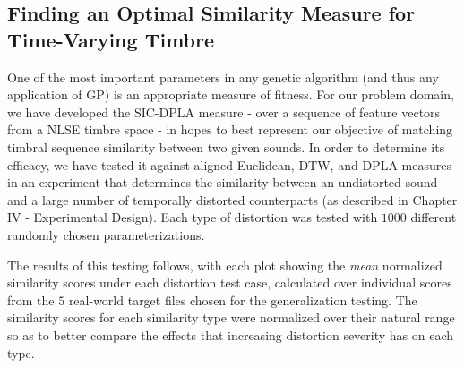 \documentclass[12pt]{report} 	%
\numberwithin{figure}{chapter}
\numberwithin{table}{chapter}
\numberwithin{equation}{chapter}
\begin{document}
\begin{flushleft}
\section{Finding an Optimal Similarity Measure for Time-Varying Timbre}
One of the most important parameters in any genetic algorithm (and thus any application of GP) is an appropriate measure of fitness. For our problem domain, we have developed the SIC-DPLA measure - over a sequence of feature vectors from a NLSE timbre space - in hopes to best represent our objective of matching timbral sequence similarity between two given sounds. In order to determine its efficacy, we have tested it against aligned-Euclidean, DTW, and DPLA measures in an experiment that determines the similarity between an undistorted sound and a large number of temporally distorted counterparts (as described in Chapter IV - Experimental Design). Each type of distortion was tested with $1000$ different randomly chosen parameterizations.

The results of this testing follows, with each plot showing the \textit{mean} normalized similarity scores under each distortion test case, calculated over individual scores from the $5$ real-world target files chosen for the generalization testing. The similarity scores for each similarity type were normalized over their natural range so as to better compare the effects that increasing distortion severity has on each type.


\end{flushleft}
\end{document}
